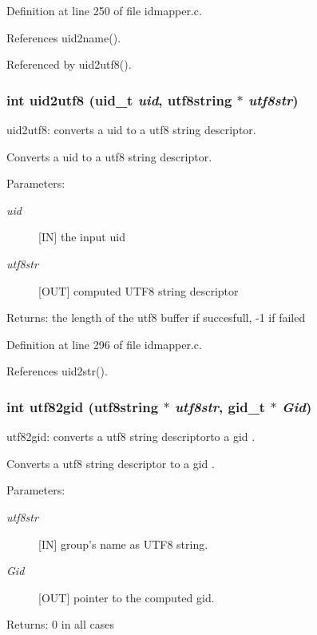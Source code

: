 Definition at line 250 of file idmapper.c.

References uid2name().

Referenced by uid2utf8().
\subsubsection{\setlength{\rightskip}{0pt plus 5cm}int uid2utf8 (uid\_\-t {\em uid}, utf8string $\ast$ {\em utf8str})}\label{idmapper_8c_a6}


uid2utf8: converts a uid to a utf8 string descriptor.

Converts a uid to a utf8 string descriptor.

\begin{Desc}
\item[Parameters:]
\begin{description}
\item[{\em uid}][IN] the input uid \item[{\em utf8str}][OUT] computed UTF8 string descriptor\end{description}
\end{Desc}
\begin{Desc}
\item[Returns:]the length of the utf8 buffer if succesfull, -1 if failed \end{Desc}


Definition at line 296 of file idmapper.c.

References uid2str().
\subsubsection{\setlength{\rightskip}{0pt plus 5cm}int utf82gid (utf8string $\ast$ {\em utf8str}, gid\_\-t $\ast$ {\em Gid})}\label{idmapper_8c_a9}


utf82gid: converts a utf8 string descriptorto a gid .

Converts a utf8 string descriptor to a gid .

\begin{Desc}
\item[Parameters:]
\begin{description}
\item[{\em utf8str}][IN] group's name as UTF8 string. \item[{\em Gid}][OUT] pointer to the computed gid.\end{description}
\end{Desc}
\begin{Desc}
\item[Returns:]0 in all cases \end{Desc}


